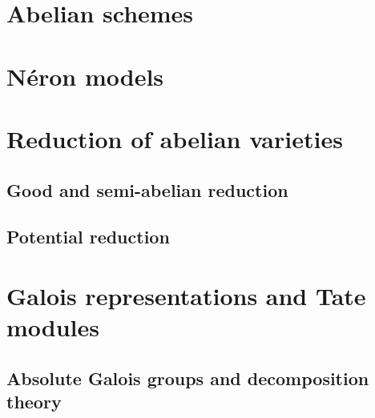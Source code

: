 
\section{Abelian schemes}




\section{Néron models}



\section{Reduction of abelian varieties}

\subsection{Good and semi-abelian reduction}




\subsection{Potential reduction}



\section{Galois representations and Tate modules}

\subsection{Absolute Galois groups and decomposition theory}


